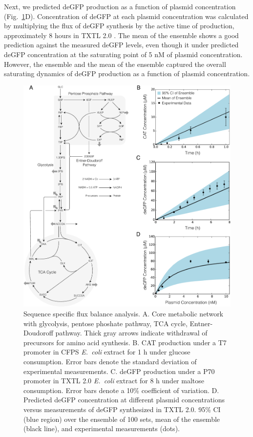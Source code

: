 \documentclass[journal=asbcd6,manuscript=article]{achemso}
\begin{document}
Next, we predicted deGFP production as a function of plasmid concentration (Fig.~\ref{fig:network}D).
Concentration of deGFP at each plasmid concentration was calculated by multiplying the flux of deGFP synthesis by the active time of production, approximately 8 hours in TXTL 2.0 \cite{Garamella:2016aa}.
The mean of the ensemble shows a good prediction against the measured deGFP levels, even though it under predicted deGFP concentration at the saturating point of 5 nM of plasmid concentration.
However, the ensemble and the mean of the ensemble captured the overall saturating dynamics of deGFP production as a function of plasmid concentration.
\begin{figure}[t!]
\centering
\includegraphics[width=1.00\textwidth]{./Figures/ssFBA_network.pdf}
\caption{Sequence specific flux balance analysis. A. Core metabolic network with glycolysis, pentose phoshate pathway, TCA cycle, Entner-Doudoroff pathway. Thick gray arrows indicate withdrawal of precursors for amino acid synthesis. B. CAT production under a T7 promoter in CFPS \textit{E.~coli} extract for 1 h under glucose consumption. Error bars denote the standard deviation of experimental measurements. C. deGFP production under a P70 promoter in TXTL 2.0 \textit{E.~coli} extract for 8 h under maltose consumption. Error bars denote a 10\% coefficient of variation. D. Predicted deGFP concentration at different plasmid concentrations versus measurements of deGFP synthesized in TXTL 2.0. 95\% CI (blue region) over the ensemble of 100 sets, mean of the ensemble (black line), and experimental measurements (dots).}
\label{fig:network}
\end{figure}
\end{document}
